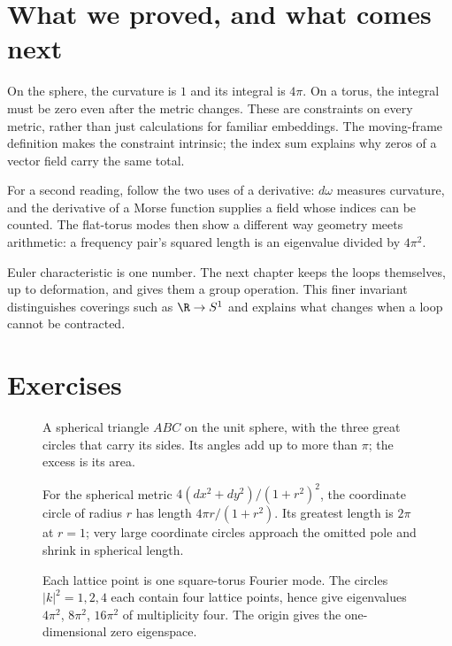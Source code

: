 \section{What we proved, and what comes next}

On the sphere, the curvature is $1$ and its integral is $4\pi$. On a torus, the integral must be zero even after the metric changes. These are constraints on every metric, rather than just calculations for familiar embeddings. The moving-frame definition makes the constraint intrinsic; the index sum explains why zeros of a vector field carry the same total.

For a second reading, follow the two uses of a derivative: $d\omega$ measures curvature, and the derivative of a Morse function supplies a field whose indices can be counted. The flat-torus modes then show a different way geometry meets arithmetic: a frequency pair's squared length is an eigenvalue divided by $4\pi^2$.

Euler characteristic is one number. The next chapter keeps the loops themselves, up to deformation, and gives them a group operation. This finer invariant distinguishes coverings such as $\R\to S^1$ and explains what changes when a loop cannot be contracted.

\section{Exercises}

\begin{figure}[ht]
\centering
{}
\caption{A spherical triangle $ABC$ on the unit sphere, with the three great circles that carry its sides. Its angles add up to more than $\pi$; the excess is its area.}
\label{fig:girard}
\end{figure}

\begin{figure}[ht]
\centering{}
\caption{For the spherical metric $4(dx^2+dy^2)/(1+r^2)^2$, the coordinate circle of radius $r$ has length $4\pi r/(1+r^2)$. Its greatest length is $2\pi$ at $r=1$; very large coordinate circles approach the omitted pole and shrink in spherical length.}
\label{fig:v9-ch04-stereographic-length}
\end{figure}

\begin{figure}[ht]
\centering{}
\caption{Each lattice point is one square-torus Fourier mode. The circles $|k|^2=1,2,4$ each contain four lattice points, hence give eigenvalues $4\pi^2$, $8\pi^2$, $16\pi^2$ of multiplicity four. The origin gives the one-dimensional zero eigenspace.}
\label{fig:v9-ch04-frequency-circles}
\end{figure}

